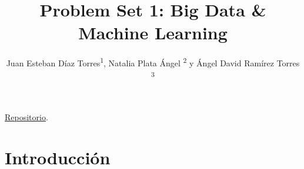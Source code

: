 \documentclass[article,11 pt]{article}
\newcommand\authormark[1]{\textsuperscript{#1}}
\begin{document}
\title{Problem Set 1: Big Data \& Machine Learning}


\author{Juan Esteban Díaz Torres\authormark{1}, Natalia Plata Ángel \authormark{2} y Ángel David Ramírez Torres \authormark{3} }

\address{\authormark{1} 202020319
\authormark{2} 202013152 
\authormark{3} 202112704 }

\href{https://github.com/angelramirez63/Problem-Set-1}{Repositorio}.





\section{Introducción}
\end{document}
